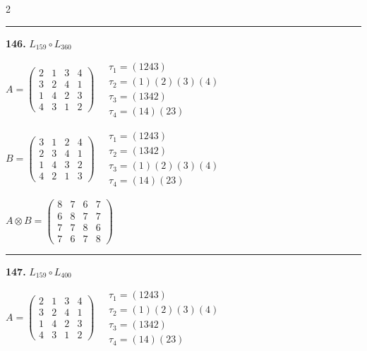 \begin{multicols}{2}
\vspace{0.3em}
\hrule
\vspace{0.3em}

\noindent\textbf{146.} $L_{159} \circ L_{360}$

$A = \begin{pmatrix} 2 & 1 & 3 & 4 \\ 3 & 2 & 4 & 1 \\ 1 & 4 & 2 & 3 \\ 4 & 3 & 1 & 2 \end{pmatrix} \quad \begin{matrix} \tau_{1}=(1 2 4 3) \\ \tau_{2}=(1)(2)(3)(4) \\ \tau_{3}=(1 3 4 2) \\ \tau_{4}=(1 4)(2 3) \end{matrix}$

$B = \begin{pmatrix} 3 & 1 & 2 & 4 \\ 2 & 3 & 4 & 1 \\ 1 & 4 & 3 & 2 \\ 4 & 2 & 1 & 3 \end{pmatrix} \quad \begin{matrix} \tau_{1}=(1 2 4 3) \\ \tau_{2}=(1 3 4 2) \\ \tau_{3}=(1)(2)(3)(4) \\ \tau_{4}=(1 4)(2 3) \end{matrix}$

$A \otimes B = \begin{pmatrix} 8 & 7 & 6 & 7 \\ 6 & 8 & 7 & 7 \\ 7 & 7 & 8 & 6 \\ 7 & 6 & 7 & 8 \end{pmatrix}$

\vspace{0.3em}
\hrule
\vspace{0.3em}

\noindent\textbf{147.} $L_{159} \circ L_{400}$

$A = \begin{pmatrix} 2 & 1 & 3 & 4 \\ 3 & 2 & 4 & 1 \\ 1 & 4 & 2 & 3 \\ 4 & 3 & 1 & 2 \end{pmatrix} \quad \begin{matrix} \tau_{1}=(1 2 4 3) \\ \tau_{2}=(1)(2)(3)(4) \\ \tau_{3}=(1 3 4 2) \\ \tau_{4}=(1 4)(2 3) \end{matrix}$


\end{multicols}
